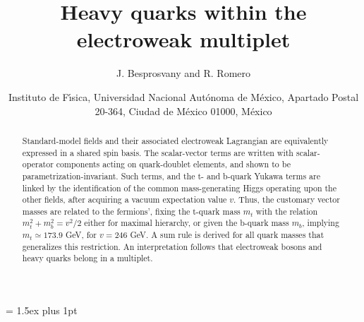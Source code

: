 \documentclass[12pt]{article}
\title{ Heavy quarks within the electroweak multiplet }
\author{J. Besprosvany and R. Romero}
\date{Instituto de F\'{\i}sica, Universidad Nacional Aut\'onoma de M\'exico,
Apartado Postal 20-364,   Ciudad de M\'exico 01000, M\'exico }
\renewcommand\[{\begin{dmath}}
\renewcommand\]{\end{dmath}}
\begin{document}
\maketitle












\jot = 1.5ex
 \def\baselinestretch{1.9}
\parskip 5pt plus 1pt

\begin{abstract}
Standard-model fields and  their  associated
electroweak   Lagrangian  are equivalently expressed in a shared spin basis.  The  scalar-vector terms are written with scalar-operator  components acting on
 quark-doublet elements, and shown  to be  parametrization-invariant.
       Such terms, and the  t- and  b-quark Yukawa  terms are linked by    the identification  of the common   mass-generating    Higgs  operating upon the other fields, after acquiring a vacuum expectation value
$v$. 
    Thus,  the customary vector  masses   are related to the fermions',
fixing  the t-quark mass $m_t$  with the relation $m^2_t+m^2_b=v^2/2$
either for maximal hierarchy, or given the b-quark mass $m_b$,  implying
$m_t
\simeq 173.9$ GeV, for
$v=246$ GeV.  A sum  rule is derived  for  all quark masses that generalizes this restriction.
An interpretation follows that electroweak bosons and heavy quarks belong in a multiplet.
\end{abstract}

\vskip 2cm
\end{document}
